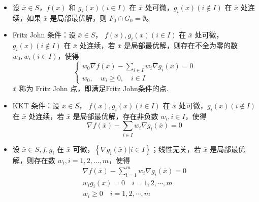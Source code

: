 \begin{remark}
\begin{itemize}
\begin{itemize}
            \item 设 $\bar{x} \in S$，$f(x)$ 和 $g_i(x)(i \in I)$ 在 $\bar{x}$ 处可微，$g_i(x)(i \notin I)$ 在 $\bar{x}$ 处连续，如果 $\bar{x}$ 是局部最优解，则 $F_0\cap G_0 = \emptyset$。
            \item Fritz John 条件：设 $\bar{x} \in S$， $f(x), g_i(x)(i \in I)$ 在 $\bar{x}$ 处可微，$g_i(x)(i\notin I)$ 在 $\bar{x}$ 处连续，若 $\bar{x}$ 是局部最优解，则存在不全为零的数 $w_0, w_i(i \in I)$，使得 \[\begin{cases}
                w_{0} \nabla f(\bar{x})-\sum_{i \in I} w_{i} \nabla g_{i}(\bar{x})=0 \\
                w_{0}, \quad w_{i} \geq 0, \quad i \in I
            \end{cases}\] $\bar{x}$ 称为 Fritz John 点，即满足Fritz John条件的点.
            \item KKT 条件：设 $\bar{x} \in S$， $f(x), g_i(x)(i \in I)$ 在 $\bar{x}$ 处可微，$g_i(x)(i\notin I)$ 在 $\bar{x}$ 处连续，若 $\bar{x}$ 是局部最优解，存在非负数 $w_i, i \in I$，使得\[\nabla f(\bar{x}) - \sum_{i \in I}w_i\nabla g_i(\bar{x}) = 0\]
            \item 设 $\bar{x} \in S, f, g_i$ 在 $\bar{x}$ 可微，$\left\{\nabla g_i(\bar{x}) | i \in I\right\}$；线性无关，若 $\bar{x}$ 是局部最优解，则存在数 $w_i, i=1, 2, \dots, m$，使得\[\begin{array}{l}
                \nabla f(\bar{x})-\sum_{\mathrm{i}=1}^{m} w_{i} \nabla g_{i}(\bar{x})=0 \\
                w_{i} g_{i}(\bar{x})=0 \quad i=1,2, \cdots, m \\
                w_{i} \geq 0 \quad i=1,2, \cdots, m 
            \end{array}\]
        \end{itemize}
    \end{itemize}
\end{remark}


